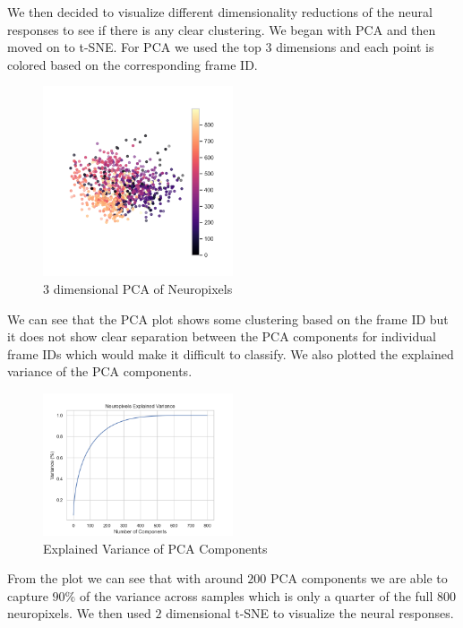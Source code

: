 \documentclass[12pt, letterpaper]{article}
\begin{document}
We then decided to visualize different dimensionality reductions of the neural responses to see if there is any clear clustering. We began with PCA and then moved on to t-SNE. For PCA we used the top $3$ dimensions and each point is colored based on the corresponding frame ID. 

\begin{figure}[H]
    \centering
    \includegraphics[width=0.5\textwidth]{3d_pca_neuropixels.png}
    \caption{3 dimensional PCA of Neuropixels}
    \label{fig:3d_pca_neuropixels}
\end{figure}

We can see that the PCA plot shows some clustering based on the frame ID but it does not show clear separation between the PCA components for individual frame IDs which would make it difficult to classify. We also plotted the explained variance of the PCA components.

\begin{figure}[H]
    \centering
    \includegraphics[width=0.5\textwidth]{neuropixels_pca_explained_variance.png}
    \caption{Explained Variance of PCA Components}
    \label{fig:explained_variance_pca}
\end{figure}

From the plot we can see that with around $200$ PCA components we are able to capture $90\%$ of the variance across samples which is only a quarter of the full $800$ neuropixels. We then used $2$ dimensional t-SNE to visualize the neural responses. 
\end{document}
